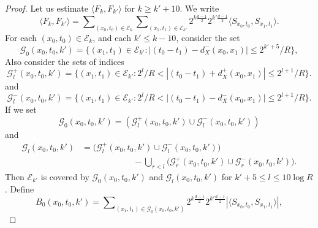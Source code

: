 \begin{proof}
%
%
Let us estimate $\langle F_k, F_{k'} \rangle$ for $k \geq k' + 10$.
We write
%
\begin{equation}
    \langle F_k, F_{k'} \rangle = \sum\nolimits_{(x_0,t_0) \in \mathcal{E}_k} \sum\nolimits_{(x_1,t_1) \in \mathcal{E}_{k'}} 2^{k \frac{d-1}{2}} 2^{k' \frac{d-1}{2}} \langle {S\!}_{x_0,t_0}, {S\!}_{x_1,t_1} \rangle.
\end{equation}
%
For each $(x_0,t_0) \in \mathcal{E}_k$, and each $k' \leq k - 10$, consider the set
%
\begin{equation}
    \mathcal{G}_0(x_0,t_0,k') = \{ (x_1,t_1) \in \mathcal{E}_{k'} : |(t_0 - t_1) - d_X^-(x_0,x_1)| \leq 2^{k' + 5} / R \},
\end{equation}
%
Also consider the sets of indices
%
\begin{equation}
    \mathcal{G}_l^+(x_0,t_0,k') = \{ (x_1,t_1) \in \mathcal{E}_{k'} : 2^{l} / R < |(t_0 - t_1) + d_X^+(x_0,x_1)| \leq 2^{l + 1} / R \}.
\end{equation}
%
and
%
\begin{equation}
    \mathcal{G}_l^-(x_0,t_0,k') = \{ (x_1,t_1) \in \mathcal{E}_{k'} : 2^{l} / R < |(t_0 - t_1) - d_X^-(x_0,x_1)| \leq 2^{l + 1} / R \}.
\end{equation}
%
If we set
%
\begin{equation}
    \mathcal{G}_0(x_0,t_0,k') = (\mathcal{G}_l^+(x_0,t_0,k') \cup \mathcal{G}_l^-(x_0,t_0,k'))
\end{equation}
%
and
%
\begin{equation}
\begin{split}
    \mathcal{G}_l(x_0,t_0,k') &= \Big( \mathcal{G}_l^+(x_0,t_0,k') \cup \mathcal{G}_l^-(x_0,t_0,k') \Big)\\
    &\quad\quad\quad\quad\quad\quad - \bigcup\nolimits_{r < l} \Big(\mathcal{G}_r^+(x_0,t_0,k') \cup \mathcal{G}_r^-(x_0,t_0,k') \Big).
\end{split}
\end{equation}
%
Then $\mathcal{E}_{k'}$ is covered by $\mathcal{G}_0(x_0,t_0,k')$ and $\mathcal{G}_l(x_0,t_0,k')$ for $k' + 5 \leq l \leq 10 \log R$. Define
%
\begin{equation}
    B_0(x_0,t_0,k') = \sum\nolimits_{(x_1,t_1) \in \mathcal{G}_0(x_0,t_0,k')} 2^{k \frac{d-1}{2}} 2^{k' \frac{d-1}{2}} |\langle {S\!}_{x_0,t_0}, {S\!}_{x_1,t_1} \rangle|,

\end{equation}
\end{proof}

